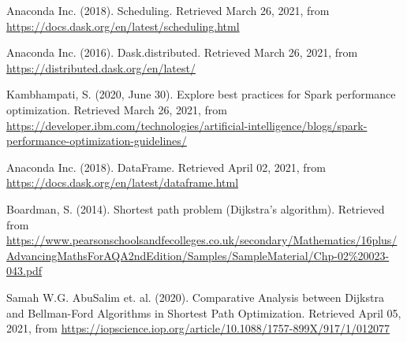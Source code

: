 \documentclass[11pt, oneside]{book}
\begin{document}
\begin{thebibliography}{111}
 Anaconda Inc. (2018). Scheduling. Retrieved March 26, 2021, from \url{https://docs.dask.org/en/latest/scheduling.html}

 Anaconda Inc. (2016). Dask.distributed. Retrieved March 26, 2021, from \url{https://distributed.dask.org/en/latest/}

 Kambhampati, S. (2020, June 30). Explore best practices for Spark performance optimization. Retrieved March 26, 2021, from \url{https://developer.ibm.com/technologies/artificial-intelligence/blogs/spark-performance-optimization-guidelines/}

 Anaconda Inc. (2018). DataFrame. Retrieved April 02, 2021, from \url{https://docs.dask.org/en/latest/dataframe.html}

 Boardman, S. (2014). Shortest path problem (Dijkstra’s algorithm). Retrieved from \url{https://www.pearsonschoolsandfecolleges.co.uk/secondary/Mathematics/16plus/AdvancingMathsForAQA2ndEdition/Samples/SampleMaterial/Chp-02\%20023-043.pdf}

 Samah W.G. AbuSalim et. al. (2020). Comparative Analysis between Dijkstra and Bellman-Ford Algorithms in Shortest Path Optimization. Retrieved April 05, 2021, from \url{https://iopscience.iop.org/article/10.1088/1757-899X/917/1/012077}


























\end{thebibliography}
\end{document}
